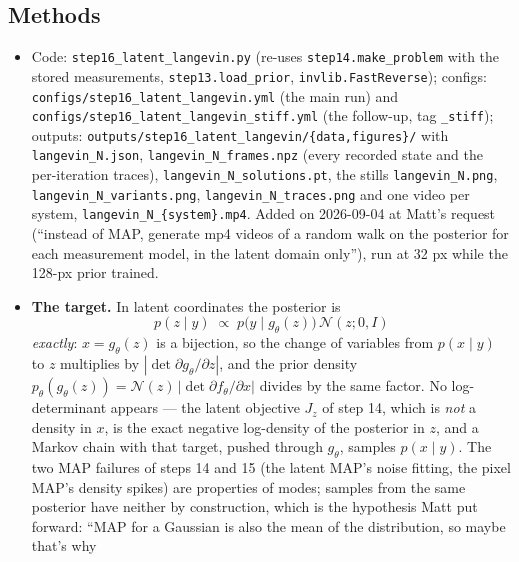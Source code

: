 \documentclass[11pt]{article}
\begin{document}
\subsection{Methods}
\begin{itemize}
  \item \begin{sloppypar}Code: \texttt{step16\_latent\_langevin.py} (re-uses
        \texttt{step14.make\_problem} with the stored measurements,
        \texttt{step13.load\_prior}, \texttt{invlib.FastReverse}); configs:
        \texttt{configs/step16\_latent\_langevin.yml} (the main run) and
        \texttt{configs/step16\_latent\_langevin\_stiff.yml} (the follow-up,
        tag \texttt{\_stiff}); outputs:
        \texttt{outputs/step16\_latent\_langevin/\{data,figures\}/} with
        \texttt{langevin\_N.json}, \texttt{langevin\_N\_frames.npz} (every
        recorded state and the per-iteration traces),
        \texttt{langevin\_N\_solutions.pt}, the stills
        \texttt{langevin\_N.png}, \texttt{langevin\_N\_variants.png},
        \texttt{langevin\_N\_traces.png} and one video per system,
        \texttt{langevin\_N\_\{system\}.mp4}. Added on 2026-09-04 at Matt's
        request (``instead of MAP, generate mp4 videos of a random walk on
        the posterior for each measurement model, in the latent domain
        only''), run at 32 px while the 128-px prior trained.\end{sloppypar}
  \item \textbf{The target.} In latent coordinates the posterior is
        \[
          p(z \mid y) \;\propto\; p\bigl(y \mid g_\theta(z)\bigr)\,\mathcal{N}(z; 0, I)
        \]
        \emph{exactly}: $x = g_\theta(z)$ is a bijection, so the change of
        variables from $p(x \mid y)$ to $z$ multiplies by
        $|\det \partial g_\theta / \partial z|$, and the prior density
        $p_\theta(g_\theta(z)) = \mathcal{N}(z)\,|\det \partial f_\theta/\partial x|$
        divides by the same factor. No log-determinant appears --- the
        latent objective $J_z$ of step 14, which is \emph{not} a density in
        $x$, is the exact negative log-density of the posterior in $z$, and
        a Markov chain with that target, pushed through $g_\theta$, samples
        $p(x \mid y)$. The two MAP failures of steps 14 and 15 (the latent
        MAP's noise fitting, the pixel MAP's density spikes) are properties
        of modes; samples from the same posterior have neither by
        construction, which is the hypothesis Matt put forward: ``MAP for a
        Gaussian is also the mean of the distribution, so maybe that's why

\end{itemize}
\end{document}
